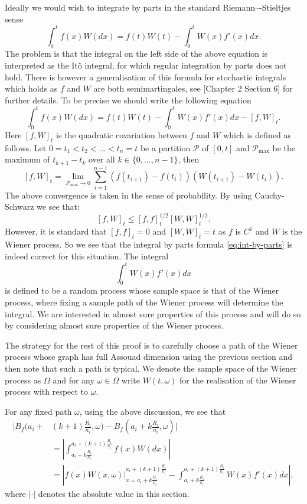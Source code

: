 	Ideally we would wish to integrate by parts in the standard Riemann–-Stieltjes sense
	\begin{equation}
	    \int_{0}^{t}f(x)W(dx)=f(t)W(t)-\int_{0}^{t}W(x)f'(x)dx.\label{eq:int-by-parts}
	\end{equation}
	The problem is that the integral on the left side of the above equation is interpreted as the It\^{o} integral, for which regular integration by parts does not hold. There is however a generalisation of this formula for stochastic integrals which holds as $f$ and $W$ are both semimartingales, see \cite{protter}[Chapter 2 Section 6] for further details. To be precise we should write the following equation
	\[
	\int_{0}^{t}f(x)W(dx)=f(t)W(t)-\int_{0}^{t}W(x)f'(x)dx-[f,W]_t.
	\]
	Here $[f,W]_t$ is the quadratic covariation between $f$ and $W$ which is defined as follows. Let $0=t_1<t_2<\dots<t_n=t$ be a partition $\mathcal{P}$ of $[0,t]$ and $\mathcal{P}_{\max}$ be the maximum of $t_{k+1}-t_k$ over all $k\in\{0,\dots,n-1\}$, then
	\[
	[f,W]_t=\lim_{\mathcal{P}_{\max}\rightarrow 0} \sum_{i=1}^{n-1} (f(t_{i+1})-f(t_{i}))(W(t_{i+1})-W(t_i)).
	\]
	The above convergence is taken in the sense of probability. By using Cauchy-Schwarz we see that:
	\[
	[f,W]_t\leq [f,f]^{1/2}_t[W,W]^{1/2}_t.
	\]
	However, it is standard that $[f,f]_t=0$ and $[W,W]_t=t$ as $f$ is $C^1$ and $W$ is the Wiener process. So we see that the integral by parts formula \eqref{eq:int-by-parts} is indeed correct for this situation. The integral 
	\[
	\int_0^{t} W(x)f'(x)dx
	\]
	is defined to be a random process whose sample space is that of the Wiener process, where fixing a sample path of the Wiener process will determine the integral. We are interested in almost sure properties of this process and will do so by considering almost sure properties of the Wiener process.
	
	The strategy for the rest of this proof is to carefully choose a path of the Wiener process whose graph has full Assouad dimension using the previous section and then note that such a path is typical. We denote the sample space of the Wiener process as $\Omega$ and for any $\omega \in \Omega$ write $W(t,\omega)$ for the realisation of the Wiener process with respect to $\omega$.
	
	For any fixed path $\omega$, using the above discussion, we see that
	\begin{align*}
		\bigg\vert B_f\bigg(a_i+&(k+1)\frac{R_i}{n_i},\omega\bigg)-B_f\left(a_i+k\frac{R_i}{n_i},\omega\right)\bigg\vert\\
		&= \left| \int_{a_i+k\frac{R_i}{n_i}}^{a_i+(k+1)\frac{R_i}{n_i}} f(x)W(dx)\right|\\
		&= \left| f\left(x\right)W(x,\omega)\bigg\vert_{x=a_i+k\frac{R_i}{n_i}}^{a_i+(k+1)\frac{R_i}{n_i}} - \int_{a_i+k\frac{R_i}{n_i}}^{a_i+(k+1)\frac{R_i}{n_i}} W(x)f'(x)dx \right|,
	\end{align*}
	where $\lvert \cdot \rvert$ denotes the absolute value in this section.
	
